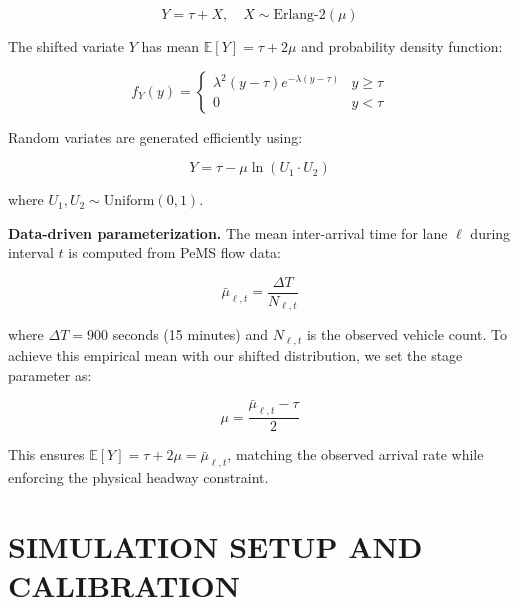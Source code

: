 \documentclass{scspaperproc}
\theoremstyle{scsthe}
\begin{document}
    \begin{equation}
        Y = \tau + X, \quad X \sim \text{Erlang-2}(\mu)
    \end{equation}

    The shifted variate $Y$ has mean $\mathbb{E}[Y] = \tau + 2\mu$ and probability density function:

    \begin{equation}
        f_Y(y) = \begin{cases}
                     \lambda^2 (y - \tau) e^{-\lambda(y - \tau)} & y \geq \tau \\
                     0 & y < \tau
        \end{cases}
    \end{equation}

    Random variates are generated efficiently using:

    \begin{equation}
        Y = \tau - \mu \ln(U_1 \cdot U_2)
    \end{equation}

    where $U_1, U_2 \sim \text{Uniform}(0,1)$.

    \textbf{Data-driven parameterization.} The mean inter-arrival time for lane $\ell$ during interval $t$ is computed from PeMS flow data:

    \begin{equation}
        \bar{\mu}_{\ell,t} = \frac{\Delta T}{N_{\ell,t}}
    \end{equation}

    where $\Delta T = 900$ seconds (15 minutes) and $N_{\ell,t}$ is the observed vehicle count. To achieve this empirical mean with our shifted distribution, we set the stage parameter as:

    \begin{equation}
        \mu = \frac{\bar{\mu}_{\ell,t} - \tau}{2}
    \end{equation}

    This ensures $\mathbb{E}[Y] = \tau + 2\mu = \bar{\mu}_{\ell,t}$, matching the observed arrival rate while enforcing the physical headway constraint.


    \section{SIMULATION SETUP AND CALIBRATION}
    \label{sec:setup}
\end{document}

